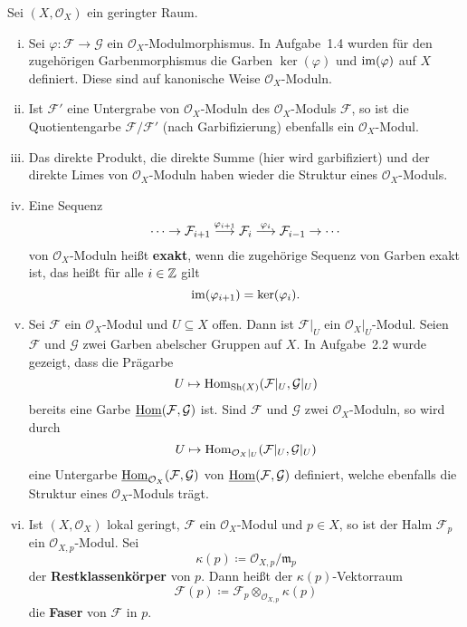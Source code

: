 \begin{bem}
	Sei $(X, \mathcal{O}_X)$ ein geringter Raum.
	\begin{enumerate}[i)]
		\item Sei $\varphi\colon \mathcal{F} \to \mathcal{G}$ ein $\mathcal{O}_X$-Modulmorphismus. In Aufgabe~1.4 wurden für den zugehörigen Garbenmorphismus die Garben $\ker(\varphi)$ und $\operatorname{im}(\varphi)$ auf $X$ definiert. Diese sind auf kanonische Weise $\mathcal{O}_X$-Moduln.
		\item Ist $\mathcal{F}'$ eine Untergrabe von $\mathcal{O}_X$-Moduln des $\mathcal{O}_X$-Moduls $\mathcal{F}$, so ist die Quotientengarbe $\mathcal{F}/\mathcal{F}'$ (nach Garbifizierung) ebenfalls ein $\mathcal{O}_X$-Modul.
		\item Das direkte Produkt, die direkte Summe (hier wird garbifiziert) und der direkte Limes von $\mathcal{O}_X$-Moduln haben wieder die Struktur eines $\mathcal{O}_X$-Moduls.
		\item Eine Sequenz
		\[
			\cdots \to \mathcal{F}_{i+1} \overset{\varphi_{i+1}}{\longrightarrow} \mathcal{F}_i \overset{\varphi_{i}}{\longrightarrow} \mathcal{F}_{i-1} \to \cdots
		\]
		von $\mathcal{O}_X$-Moduln heißt \textbf{exakt}, wenn die zugehörige Sequenz von Garben exakt ist, das heißt für alle $i \in \mathbb {Z}$ gilt
		\[
			\operatorname{im}(\varphi_{i+1}) =  \ker(\varphi_i).
		\]
		\item Sei $\mathcal{F}$ ein $\mathcal{O}_X$-Modul und $U \subseteq X$ offen. Dann ist $\mathcal{F}\vert_U$ ein $\mathcal{O}_X\vert_U$-Modul. Seien $\mathcal{F}$ und $\mathcal{G}$ zwei Garben abelscher Gruppen auf $X$. In Aufgabe~2.2 wurde gezeigt, dass die Prägarbe
		\[
			U \mapsto \operatorname{Hom}_{\operatorname{Sh}(X)}(\mathcal{F}\vert_U,\mathcal{G}\vert_U)
		\]
		bereits eine Garbe $\underline{\operatorname{Hom}}(\mathcal{F},\mathcal{G})$ ist. Sind $\mathcal{F}$ und $\mathcal{G}$ zwei $\mathcal{O}_X$-Moduln, so wird durch
		\[
			U \mapsto \operatorname{Hom}_{\mathcal{O}_X\vert_U}(\mathcal{F}\vert_U,\mathcal{G}\vert_U)
		\]
		eine Untergarbe $\underline{\operatorname{Hom}}_{\mathcal{O}_X}(\mathcal{F},\mathcal{G})$ von $\underline{\operatorname{Hom}}(\mathcal{F},\mathcal{G})$ definiert, welche ebenfalls die Struktur eines $\mathcal{O}_X$-Moduls trägt.
		\item Ist $(X, \mathcal{O}_X)$ lokal geringt, $\mathcal{F}$ ein $\mathcal{O}_X$-Modul und $p\in X$, so ist der Halm $\mathcal{F}_p$ ein $\mathcal{O}_{X,p}$-Modul. Sei
		\[
			\kappa(p) \coloneqq \mathcal{O}_{X,p}/\mathfrak{m}_p
		\]
		der \textbf{Restklassenkörper} von $p$. Dann heißt der $\kappa(p)$-Vektorraum
		\[
			\mathcal{F}(p) \coloneqq \mathcal{F}_p \otimes_{\mathcal{O}_{X,p}} \kappa(p)
		\]
		die \textbf{Faser} von $\mathcal{F}$ in $p$.
	\end{enumerate}
\end{bem}

